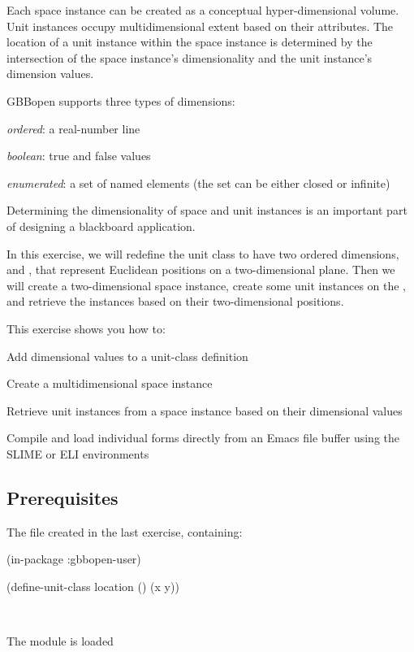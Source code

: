 \documentclass[10pt,twoside,english,pdftex]{article}
\begin{document}
Each space instance can be created as a conceptual hyper-dimensional
volume.  Unit instances occupy multidimensional extent based on their
attributes.  The location of a unit instance within the space instance
is determined by the intersection of the space instance's
dimensionality and the unit instance's dimension values.

GBBopen supports three types of dimensions:
\begin{tightitemize}
\item \textit{ordered}: a real-number line
\item \textit{boolean}: true and false values
\item \textit{enumerated}: a set of named elements (the set can be
  either closed or infinite)
\end{tightitemize}
Determining the dimensionality of space and unit instances is an
important part of designing a blackboard application.

In this exercise, we will redefine the  unit class to
have two ordered dimensions,  and , that represent Euclidean
positions on a two-dimensional plane.  Then we will create a two-dimensional
 space instance, create some 
unit instances on the , and retrieve the instances
based on their two-dimensional positions.

\fndocrule

This exercise shows you how to:
\begin{tightitemize}
\item Add dimensional values to a unit-class definition
\item Create a multidimensional space instance
\item Retrieve unit instances from a space instance based on their
  dimensional values
\item Compile and load individual forms directly from an Emacs file
  buffer using the SLIME or ELI environments
\end{tightitemize}

\fndocrule

\subsection*{Prerequisites}

\begin{tightitemize}
\item The  file created in the last
  exercise, containing:
%
\W\supp\notpretop
\begin{example}
\textcolor{darkergray}{%
  (in-package :gbbopen-user)

  (define-unit-class location ()
    (x y))}
\end{example}
\W\\

\item The  module is loaded
\end{tightitemize}
\end{document}
